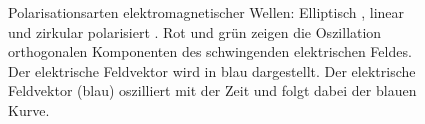 \documentclass[a4paper,12pt,twoside,parskip=no,headsepline,open=right,ngerman,export]{scrreprt}
\begin{document}
            \begin{figure}[!b]
                \centering
                 \hfil
                 \hfil
                \caption[Polarisationsellipse]{Polarisationsarten elektromagnetischer Wellen: Elliptisch , linear  und zirkular polarisiert . Rot und grün zeigen die Oszillation orthogonalen Komponenten des schwingenden elektrischen Feldes. Der elektrische Feldvektor wird in blau dargestellt. Der elektrische Feldvektor (blau) oszilliert mit der Zeit und folgt dabei der blauen Kurve.}
                \label{fig:theo_polarisation}
            \end{figure}
\end{document}
